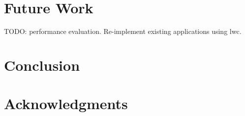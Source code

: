 \documentclass[letterpaper,twocolumn,10pt]{article}
\begin{document}
\section{Future Work}
TODO: performance evaluation.
Re-implement existing applications using lwc.

\section{Conclusion}

\section{Acknowledgments}
%
%
%
%
%
%
%
%
{\footnotesize 
}


\theendnotes
\end{document}
